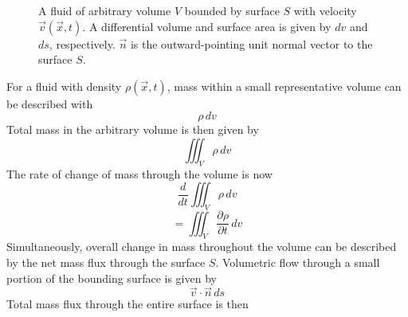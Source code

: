 \begin{figure}[h!]
\begin{center}
\end{center}
\caption{A fluid of arbitrary volume $V$ bounded by surface $S$ with velocity $\vec{v}(\vec{x},t)$. A differential volume and surface area is given by $dv$ and $ds$, respectively. $\vec{n}$ is the outward-pointing unit normal vector to the surface $S$.}
\label{cons_mass}
\end{figure}
For a fluid with density $\rho(\vec{x},t)$, mass within a small representative volume can be described with
$$ \rho \, dv$$
Total mass in the arbitrary volume is then given by 
$$\iiint_{V} \rho \,dv$$
The rate of change of mass through the volume is now 
$$\dfrac{d}{dt}\iiint_{V} \rho \, dv $$
\begin{equation} \label{volume_mass}
= \iiint_{V} \dfrac{\partial \rho}{\partial t}\,dv
\end{equation}
Simultaneously, overall change in mass throughout the volume can be described by the net mass flux through the surface $S$. Volumetric flow through a small portion of the bounding surface is given by
$$\vec{v}\cdot \vec{n} \, ds$$
Total mass flux through the entire surface is then
